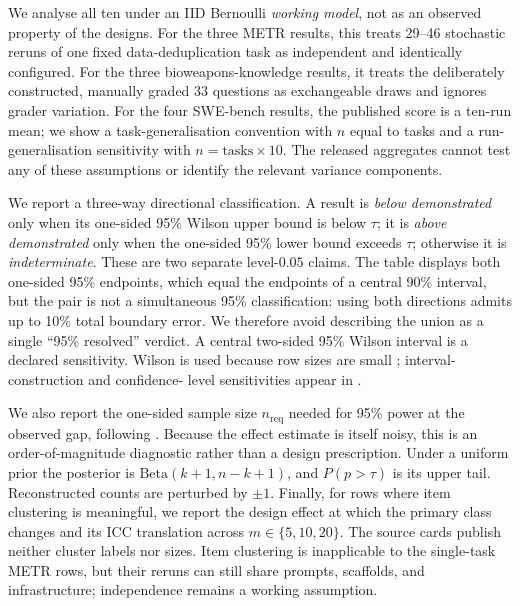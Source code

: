 \documentclass{article}
\begin{document}
We analyse all ten under an IID Bernoulli \emph{working model}, not as an observed property
of the designs. For the three METR results, this treats 29--46 stochastic reruns of one
fixed data-deduplication task as independent and identically configured. For the three
bioweapons-knowledge results, it treats the deliberately constructed, manually graded 33
questions as exchangeable draws and ignores grader variation. For the four SWE-bench
results, the published score is a ten-run mean; we show a task-generalisation convention
with $n$ equal to tasks and a run-generalisation sensitivity with
$n=\text{tasks}\times10$. The released aggregates cannot test any of these assumptions or
identify the relevant variance components.

We report a three-way directional classification. A result is \emph{below demonstrated}
only when its one-sided 95\% Wilson upper bound is below $\tau$; it is \emph{above
demonstrated} only when the one-sided 95\% lower bound exceeds $\tau$; otherwise it is
\emph{indeterminate}. These are two separate level-$0.05$ claims. The table displays both
one-sided 95\% endpoints, which equal the endpoints of a central 90\% interval, but the pair
is not a simultaneous 95\% classification: using both directions admits up to 10\% total
boundary error. We therefore avoid describing the union as a single ``95\% resolved''
verdict. A central two-sided 95\% Wilson interval is a declared sensitivity. Wilson is used
because row sizes are small \citep{brown2001interval}; interval-construction and confidence-
level sensitivities appear in .

We also report the one-sided sample size $n_{\mathrm{req}}$ needed for 95\% power at the
observed gap, following \citet{miller2024adding}. Because the effect estimate is itself
noisy, this is an order-of-magnitude diagnostic rather than a design prescription. Under a
uniform prior the posterior is $\mathrm{Beta}(k+1,n-k+1)$, and $P(p>\tau)$ is its upper
tail. Reconstructed counts are perturbed by $\pm1$. Finally, for rows where item clustering
is meaningful, we report the design effect at which the primary class changes and its ICC
translation across $m\in\{5,10,20\}$. The source cards publish neither cluster labels nor
sizes. Item clustering is inapplicable to the single-task METR rows, but their reruns can
still share prompts, scaffolds, and infrastructure; independence remains a working
assumption.



\end{document}
